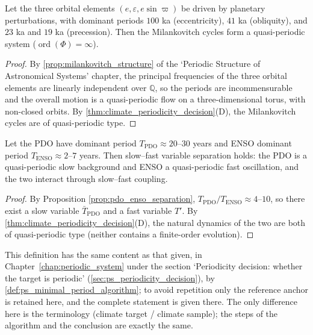 \begin{lemma}\label{lem:milankovitch_quasiperiodic}
Let the three orbital elements $(e,\varepsilon,e\sin\varpi)$ be driven by planetary perturbations, with dominant periods $100$ ka (eccentricity), $41$ ka (obliquity), and $23$ ka and $19$ ka (precession). Then the Milankovitch cycles form a quasi-periodic system ($\operatorname{ord}(\Phi)=\infty$).
\end{lemma}

\begin{proof}
By \cref{prop:milankovitch_structure} of the `Periodic Structure of Astronomical Systems' chapter, the principal frequencies of the three orbital elements are linearly independent over $\mathbb{Q}$, so the periods are incommensurable and the overall motion is a quasi-periodic flow on a three-dimensional torus, with non-closed orbits. By \cref{thm:climate_periodicity_decision}(D), the Milankovitch cycles are of quasi-periodic type.
\end{proof}

\begin{lemma}\label{lem:pdo_enso_separation_decision}
Let the PDO have dominant period $T_{\text{PDO}}\approx20$--$30$ years and ENSO dominant period $T_{\text{ENSO}}\approx2$--$7$ years. Then slow--fast variable separation holds: the PDO is a quasi-periodic slow background and ENSO a quasi-periodic fast oscillation, and the two interact through slow--fast coupling.
\end{lemma}

\begin{proof}
By Proposition \ref{prop:pdo_enso_separation}, $T_{\text{PDO}}/T_{\text{ENSO}}\approx4$--$10$, so there exist a slow variable $\bar T_{\text{PDO}}$ and a fast variable $T'$. By \cref{thm:climate_periodicity_decision}(D), the natural dynamics of the two are both of quasi-periodic type (neither contains a finite-order evolution).
\end{proof}

\begin{definition}\label{def:climate_minimal_period_algorithm}
This definition has the same content as that given, in Chapter~\ref{chap:periodic_system} under the section `Periodicity decision: whether the target is periodic' (\cref{sec:ps_periodicity_decision}), by \cref{def:ps_minimal_period_algorithm}; to avoid repetition only the reference anchor is retained here, and the complete statement is given there. The only difference here is the terminology (climate target / climate sample); the steps of the algorithm and the conclusion are exactly the same.
\end{definition}

